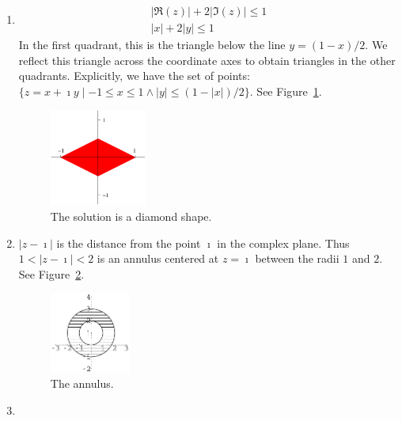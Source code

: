 {\begin{Solution}
  \label{solution Rez+2Imz1}
  \begin{enumerate}
  \item
    \begin{gather*}
      | \Re(z) | + 2 | \Im(z) | \leq 1 \\
      | x | + 2 | y | \leq 1 
    \end{gather*}
    In the first quadrant, this is the triangle below the line 
    $y = (1 - x) / 2$.  We reflect this
    triangle across the coordinate axes to obtain triangles in the 
    other quadrants.  Explicitly, we have the set of points: 
    $\{z = x + \imath y \mid  -1 \leq x \leq 1 \land |y| \leq (1 - |x|) / 2 \}$.
    See Figure~\ref{diamond-112}.
    \begin{figure}[h!]
      \begin{center}
        \includegraphics[width=0.3\textwidth]{fcv/number/diamond-112}
      \end{center}
      \caption{The solution is a diamond shape.}
      \label{diamond-112}
    \end{figure}
  \item
    $|z - \imath|$ is the distance from the point $\imath$ in the complex plane.
    Thus $1 < |z - \imath| < 2$ is an annulus centered at $z = \imath$ between the
    radii $1$ and $2$.  See Figure~\ref{annulus-i12}.
    \begin{figure}[h!]
      \begin{center}
        \includegraphics[width=0.25\textwidth]{fcv/number/annulus-i12}
      \end{center}
      \caption{The annulus.}
      \label{annulus-i12}
    \end{figure}
  \item

\end{enumerate}
\end{Solution}}
